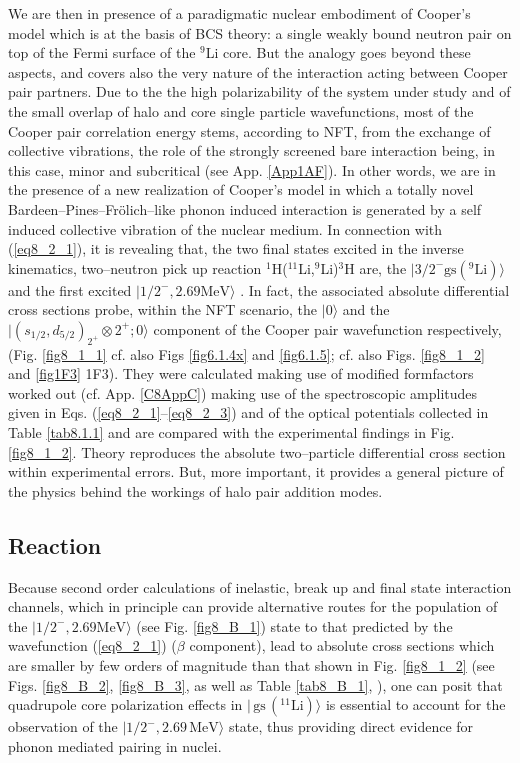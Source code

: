 We are then in presence of a paradigmatic nuclear embodiment of Cooper's model which is at the basis of BCS theory: a single weakly bound neutron pair on top of the Fermi surface of the ${}^9$Li core. But the analogy goes beyond these aspects, and covers also the very nature of the interaction acting between Cooper pair partners. Due to the  the high polarizability of the system under study and of the small overlap of halo and core single particle wavefunctions, most of the Cooper pair correlation energy stems, according to NFT, from the exchange of collective vibrations, the role of the strongly screened bare interaction being, in this case, minor and subcritical (see App. \ref{App1AF}). In other words, we are in the presence of a new realization of Cooper's model in which a totally novel Bardeen--Pines--Fr\"olich--like phonon induced interaction is generated by a self induced collective vibration of the nuclear medium. In connection with  (\ref{eq8_2_1}), it is revealing that, the two final states excited in the inverse kinematics, two--neutron pick up reaction $^1$H($^{11}$Li,$^9$Li)$^3$H are, the $|3/2^-\text{gs}(^9\text{Li})\rangle$ and the first excited $|1/2^-,2.69\text{MeV}\rangle$ \cite{Tanihata:08}. In fact, the associated absolute differential cross sections probe, within the NFT scenario, the $|0\rangle$  and the $|(s_{1/2},d_{5/2})_{2^+}\otimes 2^+;0\rangle$ component of the Cooper pair wavefunction respectively, (Fig. \ref{fig8_1_1} cf. also Figs \ref{fig6.1.4x} and \ref{fig6.1.5}; cf. also Figs. \ref{fig8_1_2} and \ref{fig1F3} 1F3). They were calculated making use of modified formfactors  worked out (cf. App. \ref{C8AppC}) making use of the spectroscopic amplitudes given in Eqs. (\ref{eq8_2_1}--\ref{eq8_2_3}) and of the optical potentials collected in Table \ref{tab8.1.1} and are compared with the experimental findings in Fig. \ref{fig8_1_2}. Theory reproduces the absolute two--particle differential cross section within experimental errors. But, more important, it provides a general picture of the physics behind the workings of halo pair addition modes.
\subsection{Reaction}\label{C6S1.2}
Because second order calculations of inelastic, break up and final state interaction channels, which in principle can provide alternative routes for the population of the $|1/2^-,2.69\text{MeV}\rangle$ (see Fig. \ref{fig8_B_1}) state to that predicted by the wavefunction (\ref{eq8_2_1})  ($\beta$ component), lead to absolute cross sections which are smaller by few orders of magnitude than that shown in Fig. \ref{fig8_1_2} (see  Figs. \ref{fig8_B_2}, \ref{fig8_B_3}, as well as Table \ref{tab8_B_1}, \cite{Potel:10}), one can posit that quadrupole core polarization effects in $|\,\text{gs}\,(^{11}\text{Li})\rangle$ is essential to account for the observation of the $|1/2^-,2.69\,\text{MeV}\rangle$ state, thus providing
 direct evidence for phonon mediated pairing in nuclei. 
 
